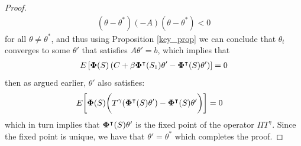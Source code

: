 \documentclass[10pt,a4paper]{amsart}
\begin{document}
\begin{proof}
 \begin{align*}
 (\theta-\theta^*)(-A)(\theta-\theta^*)<0
 \end{align*}
 for all $\theta\neq\theta^*$, and thus using Proposition \ref{key_prop} we can conclude that $\theta_t$ converges to some $\theta'$ that satisfies $A\theta'=b$, which implies that
 \begin{align*}
 E\left[{\bf \Phi}(S)\left( C+\beta {\bf \Phi}^\intercal(S_{1})\theta'- {\bf \Phi}^\intercal(S)\theta' \right) \right]=0
 \end{align*}
 then as argued earlier, $\theta'$ also satisfies:
 \begin{align*}
 &E\bigg[{\bf \Phi}(S)\bigg( T^\gamma({\bf \Phi}^\intercal(S)\theta' )- {\bf \Phi}^\intercal(S)\theta' \bigg) \bigg]=0
 \end{align*}
 which in turn implies that ${\bf \Phi}^\intercal(S)\theta' $ is the fixed point of the operator $\Pi T^\gamma$. Since the fixed point is unique, we have that $\theta'=\theta^*$ which completes the proof.


\end{proof}
\end{document}

